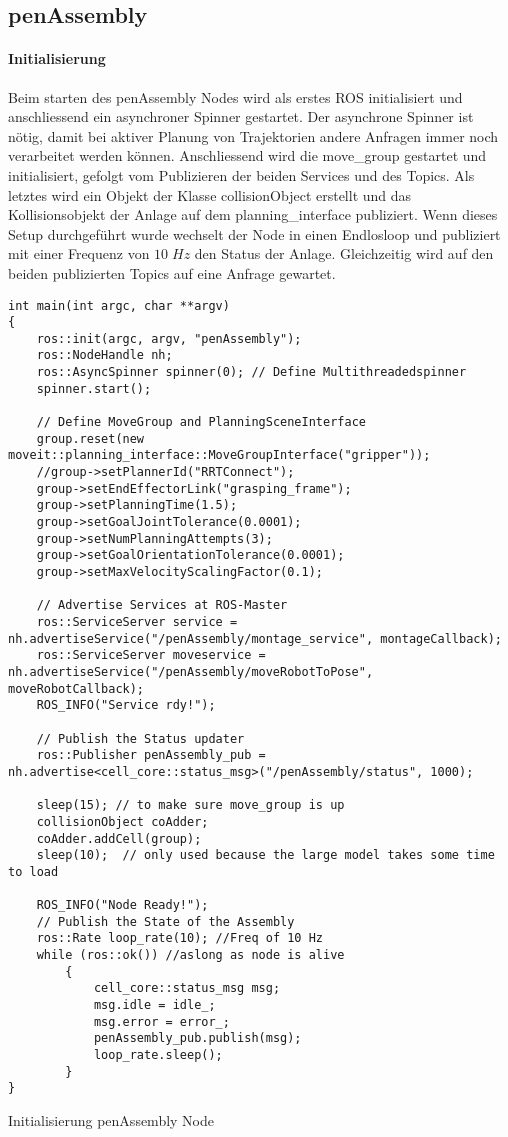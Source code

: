 \subsection{penAssembly} \label{sec:penAssembly}
\paragraph{Initialisierung}
Beim starten des penAssembly Nodes wird als erstes ROS initialisiert und anschliessend ein asynchroner Spinner gestartet. Der asynchrone Spinner ist nötig, damit bei aktiver Planung von Trajektorien andere Anfragen immer noch verarbeitet werden können. Anschliessend wird die move\_group gestartet und initialisiert, gefolgt vom Publizieren der beiden Services und des Topics. Als letztes wird ein Objekt der Klasse collisionObject erstellt und das Kollisionsobjekt der Anlage auf dem planning\_interface publiziert. Wenn dieses Setup durchgeführt wurde wechselt der Node in einen Endlosloop und publiziert mit einer Frequenz von $10\;Hz$ den Status der Anlage. Gleichzeitig wird auf den beiden publizierten Topics auf eine Anfrage gewartet.
\begin{code}
	\begin{verbatim}
int main(int argc, char **argv)
{
	ros::init(argc, argv, "penAssembly");
	ros::NodeHandle nh;
	ros::AsyncSpinner spinner(0); // Define Multithreadedspinner
	spinner.start();

	// Define MoveGroup and PlanningSceneInterface
	group.reset(new moveit::planning_interface::MoveGroupInterface("gripper"));
	//group->setPlannerId("RRTConnect");
	group->setEndEffectorLink("grasping_frame");
	group->setPlanningTime(1.5);
	group->setGoalJointTolerance(0.0001);
	group->setNumPlanningAttempts(3);
	group->setGoalOrientationTolerance(0.0001);
	group->setMaxVelocityScalingFactor(0.1);

	// Advertise Services at ROS-Master
	ros::ServiceServer service = nh.advertiseService("/penAssembly/montage_service", montageCallback);
	ros::ServiceServer moveservice = nh.advertiseService("/penAssembly/moveRobotToPose", moveRobotCallback);
	ROS_INFO("Service rdy!");

	// Publish the Status updater
	ros::Publisher penAssembly_pub = nh.advertise<cell_core::status_msg>("/penAssembly/status", 1000);

	sleep(15); // to make sure move_group is up
	collisionObject coAdder;
	coAdder.addCell(group);
	sleep(10);	// only used because the large model takes some time to load

	ROS_INFO("Node Ready!");
	// Publish the State of the Assembly
	ros::Rate loop_rate(10); //Freq of 10 Hz
	while (ros::ok()) //aslong as node is alive
		{
			cell_core::status_msg msg;
			msg.idle = idle_;
			msg.error = error_;
			penAssembly_pub.publish(msg);
			loop_rate.sleep();
		}
}	
	\end{verbatim}
	\caption{Initialisierung penAssembly Node}
	\label{code:initPenAssembly}
\end{code}

